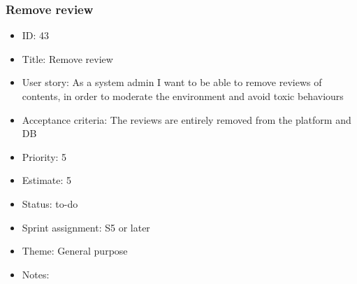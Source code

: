 \subsubsection{Remove review}
\begin{itemize}
	\item ID: 43
	\item Title: Remove review
	\item User story: As a system admin I want to be able to remove reviews of contents, in order to moderate the environment and avoid toxic behaviours
	\item Acceptance criteria: The reviews are entirely removed from the platform and DB
	\item Priority: 5
	\item Estimate: 5
	\item Status: to-do
	\item Sprint assignment: S5 or later
	\item Theme: General purpose
	\item Notes:
\end{itemize}
